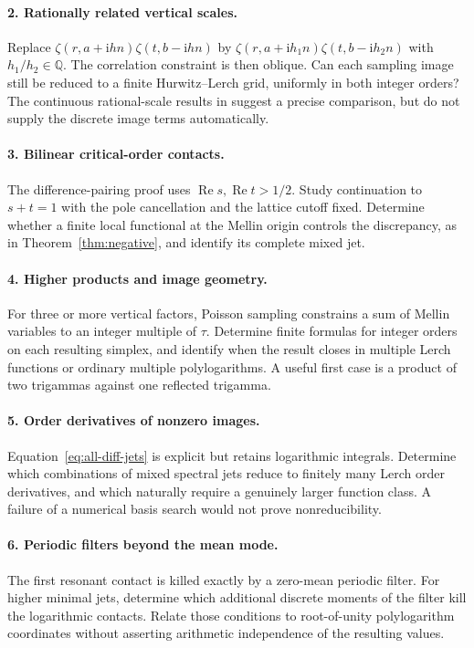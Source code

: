 \documentclass[11pt,a4paper]{article}
\numberwithin{equation}{section}
\theoremstyle{definition}
\theoremstyle{remark}
\DeclareMathOperator{\Ree}{Re}
\newcommand{\ii}{\mathrm i}
\begin{document}
\paragraph{2. Rationally related vertical scales.}
Replace $\zeta(r,a+\ii hn)\zeta(t,b-\ii hn)$ by
$\zeta(r,a+\ii h_1n)\zeta(t,b-\ii h_2n)$ with $h_1/h_2\in\mathbb Q$.
The correlation constraint is then oblique. Can each sampling image
still be reduced to a finite Hurwitz--Lerch grid, uniformly in both
integer orders? The continuous rational-scale results in
\cite{RepoVertical} suggest a precise comparison, but do not supply
the discrete image terms automatically.

\paragraph{3. Bilinear critical-order contacts.}
The difference-pairing proof uses $\Ree s,\Ree t>1/2$.
Study continuation to $s+t=1$ with the pole cancellation and the
lattice cutoff fixed. Determine whether a finite local functional
at the Mellin origin controls the discrepancy, as in
Theorem~\ref{thm:negative}, and identify its complete mixed jet.

\paragraph{4. Higher products and image geometry.}
For three or more vertical factors, Poisson sampling constrains a
sum of Mellin variables to an integer multiple of $\tau$.
Determine finite formulas for integer orders on each resulting
simplex, and identify when the result closes in multiple Lerch
functions or ordinary multiple polylogarithms. A useful first case
is a product of two trigammas against one reflected trigamma.

\paragraph{5. Order derivatives of nonzero images.}
Equation~\eqref{eq:all-diff-jets} is explicit but retains logarithmic
integrals. Determine which combinations of mixed spectral jets
reduce to finitely many Lerch order derivatives, and which naturally
require a genuinely larger function class. A failure of a numerical
basis search would not prove nonreducibility.

\paragraph{6. Periodic filters beyond the mean mode.}
The first resonant contact is killed exactly by a zero-mean periodic
filter. For higher minimal jets, determine which additional discrete
moments of the filter kill the logarithmic contacts. Relate those
conditions to root-of-unity polylogarithm coordinates without
asserting arithmetic independence of the resulting values.
\end{document}
